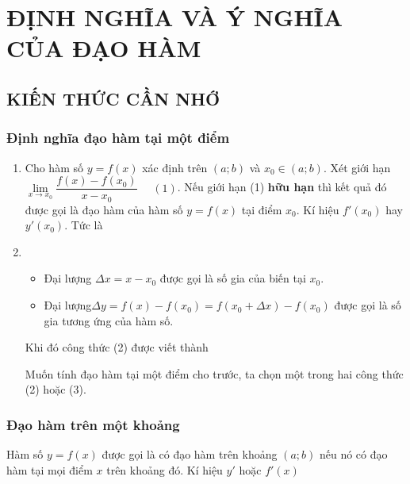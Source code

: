 \section{ĐỊNH NGHĨA VÀ Ý NGHĨA CỦA ĐẠO HÀM}
\subsection{KIẾN THỨC CẦN NHỚ}
\subsubsection{Định nghĩa đạo hàm tại một điểm}
\begin{enumerate}[\iconMT]
	\item {} Cho hàm số $y=f(x)$ xác định trên $(a;b)$ và $x_0 \in (a;b)$. Xét giới hạn $\lim\limits_{x\to x_0}\dfrac{f(x)-f(x_0)}{x-x_0}$ $\quad (1)$. Nếu giới hạn (1)  \textbf{hữu hạn} thì kết quả đó được gọi là đạo hàm của hàm số $y=f(x)$ tại điểm $x_0$. Kí hiệu $f'(x_0)$ hay $y'(x_0)$. Tức là
	\item {}
	\begin{itemize}
		\item Đại lượng $\Delta x =x-x_0$ được gọi là số gia của biến tại $x_0$.
		\item Đại lượng$\Delta y =f(x)-f(x_0)=f(x_0+\Delta x)-f(x_0)$ được gọi là số gia tương ứng của hàm số.
	\end{itemize}
	Khi đó công thức (2) được viết thành 
	\begin{note}
		Muốn tính đạo hàm tại một điểm cho trước, ta chọn một trong hai công thức (2) hoặc (3).
	\end{note}
\end{enumerate}

\subsubsection{Đạo hàm trên một khoảng}
Hàm số $y=f(x)$ được gọi là có đạo hàm trên khoảng $(a;b)$ nếu nó có đạo hàm tại mọi điểm  $x$ trên khoảng đó. Kí hiệu $y'$ hoặc $f'(x)$

